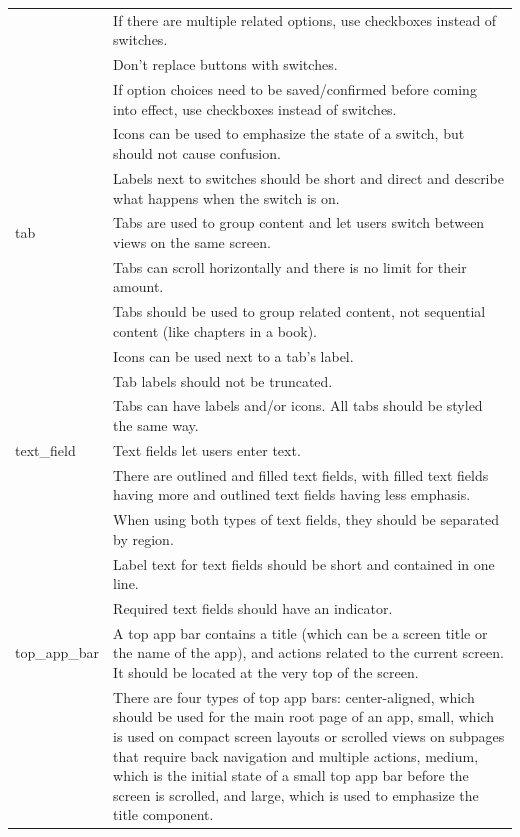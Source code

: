 \documentclass[11pt,titlepage,oneside,openany]{book}
\begin{document}
\begin{longtable}{|p{}|p{}|}
	~ & If there are multiple related options, use checkboxes instead of switches. \\ 
	~ & Don't replace buttons with switches. \\ 
	~ & If option choices need to be saved/confirmed before coming into effect, use checkboxes instead of switches. \\ 
	~ & Icons can be used to emphasize the state of a switch, but should not cause confusion. \\ 
	~ & Labels next to switches should be short and direct and describe what happens when the switch is on. \\ \hline
	tab & Tabs are used to group content and let users switch between views on the same screen. \\ 
	~ & Tabs can scroll horizontally and there is no limit for their amount. \\ 
	~ & Tabs should be used to group related content, not sequential content (like chapters in a book). \\ 
	~ & Icons can be used next to a tab's label. \\ 
	~ & Tab labels should not be truncated. \\ 
	~ & Tabs can have labels and/or icons. All tabs should be styled the same way. \\ \hline
	text\_field & Text fields let users enter text. \\ 
	~ & There are outlined and filled text fields, with filled text fields having more and outlined text fields having less emphasis. \\ 
	~ & When using both types of text fields, they should be separated by region. \\ 
	~ & Label text for text fields should be short and contained in one line. \\ 
	~ & Required text fields should have an indicator. \\ \hline
	top\_app\_bar & A top app bar contains a title (which can be a screen title or the name of the app), and actions related to the current screen. It should be located at the very top of the screen. \\ 
	~ & There are four types of top app bars: center-aligned, which should be used for the main root page of an app, small, which is used on compact screen layouts or scrolled views on subpages that require back navigation and multiple actions, medium, which is the initial state of a small top app bar before the screen is scrolled, and large, which is used to emphasize the title component. \\ 

\end{longtable}
\end{document}
